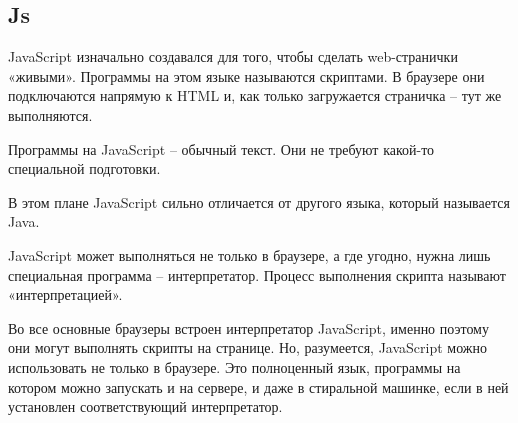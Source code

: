 \subsection{Js}

JavaScript изначально создавался для того, чтобы сделать web-странички «живыми». Программы на этом языке называются скриптами. В браузере они подключаются напрямую к HTML и, как только загружается страничка – тут же выполняются.

Программы на JavaScript – обычный текст. Они не требуют какой-то специальной подготовки.

В этом плане JavaScript сильно отличается от другого языка, который называется Java.

JavaScript может выполняться не только в браузере, а где угодно, нужна лишь специальная программа – интерпретатор. Процесс выполнения скрипта называют «интерпретацией».

Во все основные браузеры встроен интерпретатор JavaScript, именно поэтому они могут выполнять скрипты на странице. Но, разумеется, JavaScript можно использовать не только в браузере. Это полноценный язык, программы на котором можно запускать и на сервере, и даже в стиральной машинке, если в ней установлен соответствующий интерпретатор.